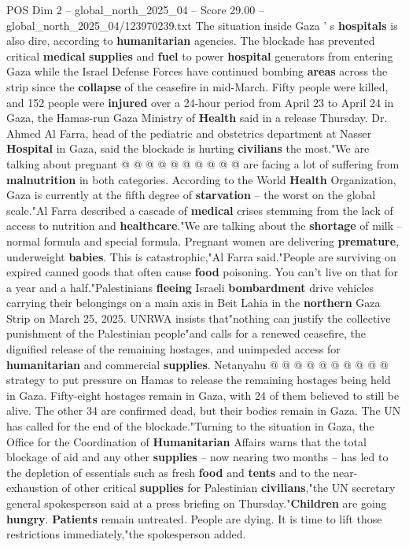 \begin{textsample}{POS Dim 2 – global\_north\_2025\_04 – Score 29.00 – global\_north\_2025\_04/123970239.txt}
The situation inside Gaza ' s \textbf{hospitals} is also dire, according to \textbf{humanitarian} agencies.
The blockade has prevented critical \textbf{medical} \textbf{supplies} and \textbf{fuel} to power \textbf{hospital} generators from entering Gaza while the Israel Defense Forces have continued bombing \textbf{areas} across the strip since the \textbf{collapse} of the ceasefire in mid-March.
Fifty people were killed, and 152 people were \textbf{injured} over a 24-hour period from April 23 to April 24 in Gaza, the Hamas-run Gaza Ministry of \textbf{Health} said in a release Thursday.
Dr.
Ahmed Al Farra, head of the pediatric and obstetrics department at Nasser \textbf{Hospital} in Gaza, said the blockade is hurting \textbf{civilians} the most."We are talking about pregnant @ @ @ @ @ @ @ @ @ @ are facing a lot of suffering from \textbf{malnutrition} in both categories.
According to the World \textbf{Health} Organization, Gaza is currently at the fifth degree of \textbf{starvation} -- the worst on the global scale."Al Farra described a cascade of \textbf{medical} crises stemming from the lack of access to nutrition and \textbf{healthcare}."We are talking about the \textbf{shortage} of milk -- normal formula and special formula.
Pregnant women are delivering \textbf{premature}, underweight \textbf{babies}.
This is catastrophic,"Al Farra said."People are surviving on expired canned goods that often cause \textbf{food} poisoning.
You can't live on that for a year and a half."Palestinians \textbf{fleeing} Israeli \textbf{bombardment} drive vehicles carrying their belongings on a main axis in Beit Lahia in the \textbf{northern} Gaza Strip on March 25, 2025.
UNRWA insists that"nothing can justify the collective punishment of the Palestinian people"and calls for a renewed ceasefire, the dignified release of the remaining hostages, and unimpeded access for \textbf{humanitarian} and commercial \textbf{supplies}.
Netanyahu @ @ @ @ @ @ @ @ @ @ strategy to put pressure on Hamas to release the remaining hostages being held in Gaza.
Fifty-eight hostages remain in Gaza, with 24 of them believed to still be alive.
The other 34 are confirmed dead, but their bodies remain in Gaza.
The UN has called for the end of the blockade."Turning to the situation in Gaza, the Office for the Coordination of \textbf{Humanitarian} Affairs warns that the total blockage of aid and any other \textbf{supplies} -- now nearing two months -- has led to the depletion of essentials such as fresh \textbf{food} and \textbf{tents} and to the near-exhaustion of other critical \textbf{supplies} for Palestinian \textbf{civilians},"the UN secretary general spokesperson said at a press briefing on Thursday."\textbf{Children} are going \textbf{hungry}. \textbf{Patients} remain untreated.
People are dying.
It is time to lift those restrictions immediately,"the spokesperson added.

\end{textsample}
